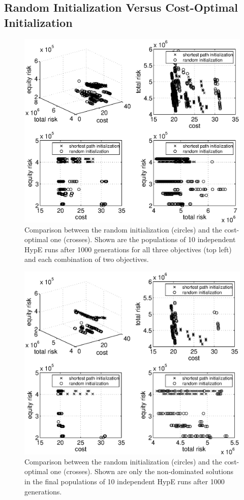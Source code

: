 \documentclass[preprint,12pt]{elsarticle}
\begin{document}
\subsection{Random Initialization Versus Cost-Optimal Initialization}

\begin{figure}%
	\includegraphics[width=\columnwidth]{../experiments/randVsCost/allsolutions.eps}%
	\caption{\label{fig:allsolutions} Comparison between the random initialization (circles) and the cost-optimal one (crosses). Shown are the populations of 10 independent HypE runs after 1000 generations for all three objectives (top left) and each combination of two objectives.}
\end{figure}

\begin{figure}%
	\includegraphics[width=\columnwidth]{../experiments/randVsCost/onlynondominated.eps}%
	\caption{\label{fig:onlynondominated} Comparison between the random initialization (circles) and the cost-optimal one (crosses). Shown are only the non-dominated solutions in the final populations of 10 independent HypE runs after 1000 generations.}
\end{figure}
\end{document}
